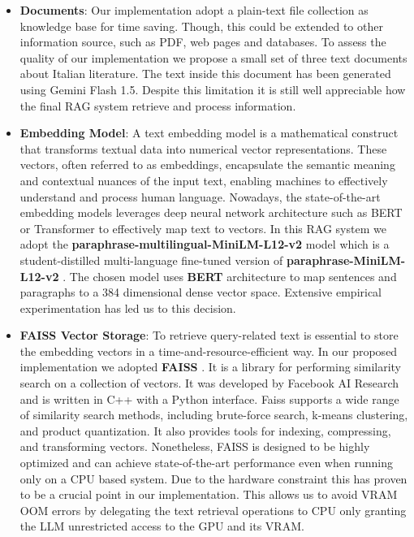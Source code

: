 \documentclass{article}
\begin{document}
	\begin{itemize}
		\item \textbf{Documents}: Our implementation adopt a plain-text file collection as knowledge base for time saving. Though, this could be extended to other information source, such as PDF, web pages and databases. To assess the quality of our implementation we propose a small set of three text documents about Italian literature. The text inside this document has been generated using Gemini Flash 1.5. Despite this limitation it is still well appreciable how the final RAG system retrieve and process information.  
		
		\item \textbf{Embedding Model}: A text embedding model is a mathematical construct that transforms textual data into numerical vector representations. These vectors, often referred to as embeddings, encapsulate the semantic meaning and contextual nuances of the input text, enabling machines to effectively understand and process human language. Nowadays, the state-of-the-art embedding models leverages deep neural network architecture such as BERT \cite{devlin2019bertpretrainingdeepbidirectional} or Transformer \cite{vaswani2023attentionneed} to effectively map text to vectors.
		In this RAG system we adopt the \textbf{paraphrase-multilingual-MiniLM-L12-v2} model which is a student-distilled multi-language fine-tuned version of \textbf{paraphrase-MiniLM-L12-v2} \cite{wang2020minilmdeepselfattentiondistillation}.
		The chosen model uses \textbf{BERT} architecture to map sentences and paragraphs to a 384 dimensional dense vector space. Extensive empirical experimentation has led us to this decision. 
		
		\item \textbf{FAISS Vector Storage}: To retrieve query-related text is essential to store the embedding vectors in a time-and-resource-efficient way. In our proposed implementation we adopted \textbf{FAISS} \cite{douze2024faisslibrary}. It is a library for performing similarity search on a collection of vectors.  It was developed by Facebook AI Research and is written in C++ with a Python interface.  Faiss supports a wide range of similarity search methods, including brute-force search, k-means clustering, and product quantization.  It also provides tools for indexing, compressing, and transforming vectors. Nonetheless, FAISS is designed to be highly optimized and can achieve state-of-the-art performance even when running only on a CPU based system. 
		Due to the hardware constraint this has proven to be a crucial point in our implementation. This allows us to avoid VRAM OOM errors by delegating the text retrieval operations to CPU only granting the LLM unrestricted access to the GPU and its VRAM.
		

\end{itemize}
\end{document}
